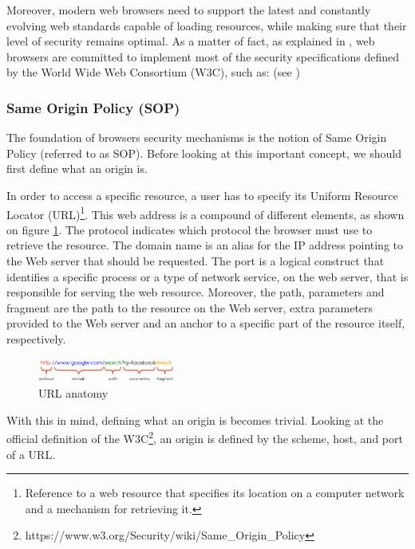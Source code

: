 \documentclass[journal]{IEEEtran}
\begin{document}
Moreover, modern web browsers need to support the latest and constantly evolving web standards capable of loading resources, while making sure that their level of security remains optimal. As a matter of fact, as explained in \cite{browserSecurity}, web browsers are committed to implement most of the security specifications defined by the World Wide Web Consortium (W3C), such as: (see \cite{SOP} \cite{CORS} \cite{CSP} \cite{SRI} \cite{MixedContent})

\medskip

\subsubsection{Same Origin Policy (SOP)}

The foundation of browsers security mechanisms is the notion of Same Origin Policy (referred to as SOP). Before looking at this important concept, we should first define what an origin is.

\medskip

In order to access a specific resource, a user has to specify its Uniform Resource Locator (URL)\footnote{Reference to a web resource that specifies its location on a computer network and a mechanism for retrieving it.}. This web address is a compound of different elements, as shown on figure \ref{fig:URL}. The protocol indicates which protocol the browser must use to retrieve the resource. The domain name is an alias for the IP address pointing to the Web server that should be requested. The port is a logical construct that identifies a specific process or a type of network service, on the web server, that is responsible for serving the web resource. Moreover, the path, parameters and fragment are the path to the resource on the Web server, extra parameters provided to the Web server and an anchor to a specific part of the resource itself, respectively.

\begin{figure}[h]
\centering
\includegraphics[width=0.4\textwidth]{images/URL.png}
\caption{URL anatomy}
\label{fig:URL}
\end{figure}

\medskip

With this in mind, defining what an origin is becomes trivial. Looking at the official definition of the W3C\footnote{https://www.w3.org/Security/wiki/Same\_Origin\_Policy}, an origin is defined by the scheme, host, and port of a URL.
\end{document}

